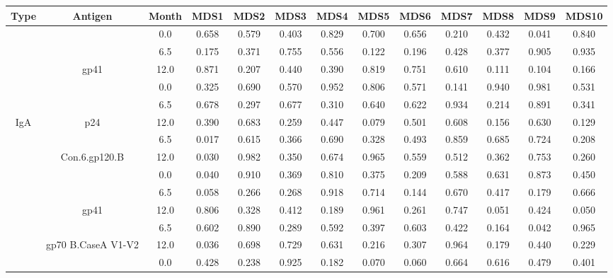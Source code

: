 \documentclass[12pt]{article} %
\begin{document}
 
\begin{tabular}{ccccccccccccc}
\toprule
Type & Antigen & Month & MDS1 & MDS2 & MDS3 & MDS4 & MDS5 & MDS6 & MDS7 & MDS8 & MDS9 & MDS10\\
\midrule
 &  & 0.0 & 0.658 & 0.579 & 0.403 & 0.829 & 0.700 & 0.656 & 0.210 & 0.432 & 0.041 & 0.840\\
\cmidrule{3-13}
 &  & 6.5 & 0.175 & 0.371 & 0.755 & 0.556 & 0.122 & 0.196 & 0.428 & 0.377 & 0.905 & 0.935\\
\cmidrule{3-13}
 & \multirow{-3}{*}{\centering\arraybackslash gp41} & 12.0 & 0.871 & 0.207 & 0.440 & 0.390 & 0.819 & 0.751 & 0.610 & 0.111 & 0.104 & 0.166\\
\cmidrule{2-13}
 &  & 0.0 & 0.325 & 0.690 & 0.570 & 0.952 & 0.806 & 0.571 & 0.141 & 0.940 & 0.981 & 0.531\\
\cmidrule{3-13}
 &  & 6.5 & 0.678 & 0.297 & 0.677 & 0.310 & 0.640 & 0.622 & 0.934 & 0.214 & 0.891 & 0.341\\
\cmidrule{3-13}
\multirow{-6}{*}{\centering\arraybackslash IgA} & \multirow{-3}{*}{\centering\arraybackslash p24} & 12.0 & 0.390 & 0.683 & 0.259 & 0.447 & 0.079 & 0.501 & 0.608 & 0.156 & 0.630 & 0.129\\
\cmidrule{1-13}
 &  & 6.5 & 0.017 & 0.615 & 0.366 & 0.690 & 0.328 & 0.493 & 0.859 & 0.685 & 0.724 & 0.208\\
\cmidrule{3-13}
 & \multirow{-2}{*}{\centering\arraybackslash Con.6.gp120.B} & 12.0 & 0.030 & 0.982 & 0.350 & 0.674 & 0.965 & 0.559 & 0.512 & 0.362 & 0.753 & 0.260\\
\cmidrule{2-13}
 &  & 0.0 & 0.040 & 0.910 & 0.369 & 0.810 & 0.375 & 0.209 & 0.588 & 0.631 & 0.873 & 0.450\\
\cmidrule{3-13}
 &  & 6.5 & 0.058 & 0.266 & 0.268 & 0.918 & 0.714 & 0.144 & 0.670 & 0.417 & 0.179 & 0.666\\
\cmidrule{3-13}
 & \multirow{-3}{*}{\centering\arraybackslash gp41} & 12.0 & 0.806 & 0.328 & 0.412 & 0.189 & 0.961 & 0.261 & 0.747 & 0.051 & 0.424 & 0.050\\
\cmidrule{2-13}
 &  & 6.5 & 0.602 & 0.890 & 0.289 & 0.592 & 0.397 & 0.603 & 0.422 & 0.164 & 0.042 & 0.965\\
\cmidrule{3-13}
 & \multirow{-2}{*}{\centering\arraybackslash gp70 B.CaseA V1-V2} & 12.0 & 0.036 & 0.698 & 0.729 & 0.631 & 0.216 & 0.307 & 0.964 & 0.179 & 0.440 & 0.229\\
\cmidrule{2-13}
 &  & 0.0 & 0.428 & 0.238 & 0.925 & 0.182 & 0.070 & 0.060 & 0.664 & 0.616 & 0.479 & 0.401\\
\cmidrule{3-13}

\end{tabular}
\end{document}
